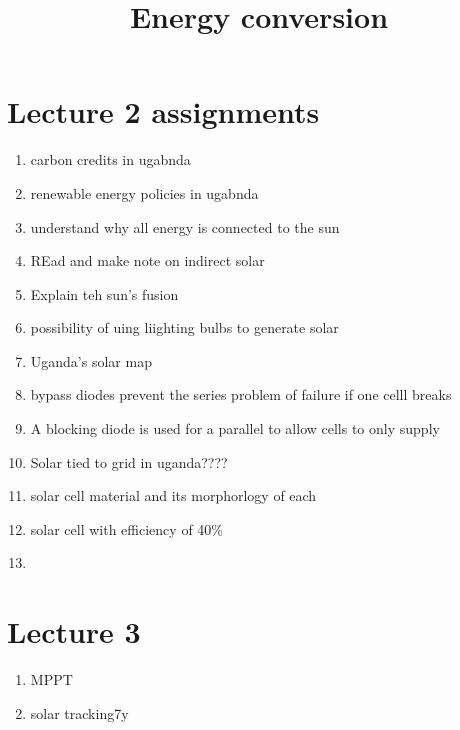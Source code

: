 \documentclass{article}
\title{Energy conversion}
\begin{document}
\maketitle

\section*{Lecture 2 assignments}
\begin{enumerate}
    \item carbon credits in ugabnda
    \item renewable energy policies in ugabnda
    \item understand why all energy is connected to the sun
    \item REad and make note on indirect solar
    \item Explain teh sun's fusion
    \item possibility of uing liighting bulbs to generate solar
    \item Uganda's solar map
    \item bypass diodes prevent the series problem of failure if one celll breaks
    \item A blocking diode is used for a parallel to allow cells to only supply 
    \item Solar tied to grid in uganda????
    \item solar cell material and its morphorlogy of each
    \item solar cell with efficiency of 40\%
    \item  
\end{enumerate}

\section{Lecture 3}

\begin{enumerate}
    \item MPPT
    \item solar tracking7y
\end{enumerate}
\end{document}
